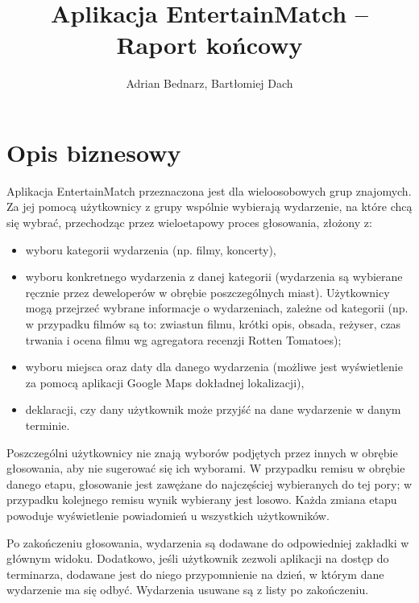 \documentclass[10pt,a4paper]{article}
\title{Aplikacja EntertainMatch -- Raport końcowy}
\author{Adrian Bednarz, Bartłomiej Dach}
\begin{document}
\maketitle

\section{Opis biznesowy}

Aplikacja EntertainMatch przeznaczona jest dla wieloosobowych grup znajomych.
Za jej pomocą użytkownicy z grupy wspólnie wybierają wydarzenie, na które chcą się wybrać,
przechodząc przez wieloetapowy proces głosowania, złożony z:

\begin{itemize}
	\item wyboru kategorii wydarzenia (np. filmy, koncerty),
	\item wyboru konkretnego wydarzenia z danej kategorii (wydarzenia są wybierane ręcznie przez
		deweloperów w obrębie poszczególnych miast). Użytkownicy mogą przejrzeć wybrane
		informacje o wydarzeniach, zależne od kategorii (np. w przypadku filmów są to:
		zwiastun filmu, krótki opis, obsada, reżyser, czas trwania i ocena filmu wg agregatora
		recenzji Rotten Tomatoes);
	\item wyboru miejsca oraz daty dla danego wydarzenia (możliwe jest wyświetlenie za pomocą
		aplikacji Google Maps dokładnej lokalizacji),
	\item deklaracji, czy dany użytkownik może przyjść na dane wydarzenie w danym terminie.
\end{itemize}

Poszczególni użytkownicy nie znają wyborów podjętych przez innych w obrębie głosowania, aby nie
sugerować się ich wyborami.
W przypadku remisu w obrębie danego etapu, głosowanie jest zawężane do najczęściej wybieranych
do tej pory; w przypadku kolejnego remisu wynik wybierany jest losowo.
Każda zmiana etapu powoduje wyświetlenie powiadomień u wszystkich użytkowników.

Po zakończeniu głosowania, wydarzenia są dodawane do odpowiedniej zakładki w głównym widoku.
Dodatkowo, jeśli użytkownik zezwoli aplikacji na dostęp do terminarza, dodawane jest do niego
przypomnienie na dzień, w którym dane wydarzenie ma się odbyć. Wydarzenia usuwane są z listy po
zakończeniu.
\end{document}
